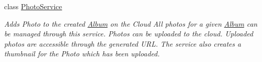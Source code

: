 \begin{DoxyCompactItemize}
class \hyperlink{classcom_1_1shephertz_1_1app42_1_1paas_1_1sdk_1_1csharp_1_1gallery_1_1_photo_service}{Photo\+Service}
\begin{DoxyCompactList}\small\item\em Adds Photo to the created \hyperlink{classcom_1_1shephertz_1_1app42_1_1paas_1_1sdk_1_1csharp_1_1gallery_1_1_album}{Album} on the Cloud All photos for a given \hyperlink{classcom_1_1shephertz_1_1app42_1_1paas_1_1sdk_1_1csharp_1_1gallery_1_1_album}{Album} can be managed through this service. Photos can be uploaded to the cloud. Uploaded photos are accessible through the generated U\+R\+L. The service also creates a thumbnail for the Photo which has been uploaded. \end{DoxyCompactList}\end{DoxyCompactItemize}
